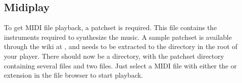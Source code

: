 \subsection{Midiplay}

To get MIDI file playback, a patchset is required. This file contains the
instruments required to synthesize the music. A sample patchset is available
through the wiki at , and needs to be extracted
to the  directory in the root of your player. There should
now be a  directory, with the patchset directory
containing several  files and two  files. Just
select a MIDI file with either the  or  extension
in the file browser to start playback.

